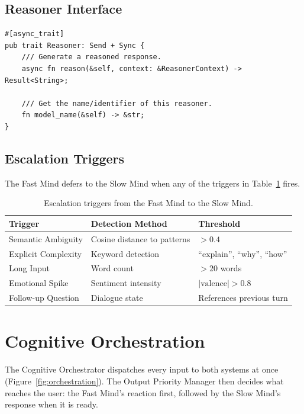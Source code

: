 \documentclass[11pt,letterpaper]{article}
\renewcommand{\arraystretch}{1.3}
\begin{document}
\subsection{Reasoner Interface}

\begin{lstlisting}[caption=Reasoner Trait]
#[async_trait]
pub trait Reasoner: Send + Sync {
    /// Generate a reasoned response.
    async fn reason(&self, context: &ReasonerContext) -> Result<String>;

    /// Get the name/identifier of this reasoner.
    fn model_name(&self) -> &str;
}
\end{lstlisting}

\subsection{Escalation Triggers}

The Fast Mind defers to the Slow Mind when any of the triggers in Table~\ref{tab:escalation} fires.

\begin{table}[!htbp]
\centering
\caption{Escalation triggers from the Fast Mind to the Slow Mind.}\label{tab:escalation}
\renewcommand{\arraystretch}{1.2}
\begin{tabular}{lll}
\toprule
\textbf{Trigger} & \textbf{Detection Method} & \textbf{Threshold} \\
\midrule
Semantic Ambiguity & Cosine distance to patterns & $> 0.4$ \\
Explicit Complexity & Keyword detection & ``explain'', ``why'', ``how'' \\
Long Input & Word count & $> 20$ words \\
Emotional Spike & Sentiment intensity & $|\text{valence}| > 0.8$ \\
Follow-up Question & Dialogue state & References previous turn \\
\bottomrule
\end{tabular}
\end{table}

\section{Cognitive Orchestration}

The Cognitive Orchestrator dispatches every input to both systems at once (Figure~\ref{fig:orchestration}). The Output Priority Manager then decides what reaches the user: the Fast Mind's reaction first, followed by the Slow Mind's response when it is ready.
\end{document}
